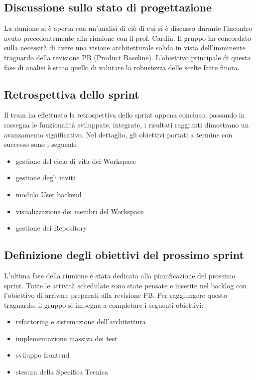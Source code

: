 \documentclass[a4paper, 11pt]{article}
\begin{document}
\subsection{Discussione sullo stato di progettazione}
La riunione si è aperta con un'analisi di ciò di cui si è discusso durante l'incontro avuto precedentemente alla riunione con il prof. Cardin. Il gruppo ha concordato sulla necessità di avere una visione architetturale solida in vista dell'imminente traguardo della revisione PB (Product Baseline). L'obiettivo principale di questa fase di analisi è stato quello di valutare la robustezza delle scelte fatte finora.

\subsection{Retrospettiva dello sprint}
Il team ha effettuato la retrospettiva dello sprint appena concluso, passando in rassegna le funzionalità sviluppate, integrate, i risultati raggiunti dimostrano un avanzamento significativo. Nel dettaglio, gli obiettivi portati a termine con successo sono i seguenti:
\begin{itemize}
    \item gestione del ciclo di vita dei Workspace
    \item gestione degli inviti
    \item modulo User backend
    \item visualizzazione dei membri del Workspace
    \item gestione dei Repository
\end{itemize}

\subsection{Definizione degli obiettivi del prossimo sprint}
L'ultima fase della riunione è stata dedicata alla pianificazione del prossimo sprint. Tutte le attività schedulate sono state pensate e inserite nel backlog con l'obiettivo di arrivare preparati alla revisione PB.
Per raggiungere questo traguardo, il gruppo si impegna a completare i seguenti obiettivi:
\begin{itemize}
    \item refactoring e sistemazione dell'architettura
    \item implementazione massiva dei test
    \item sviluppo frontend
    \item stesura della Specifica Tecnica
\end{itemize}
\end{document}
